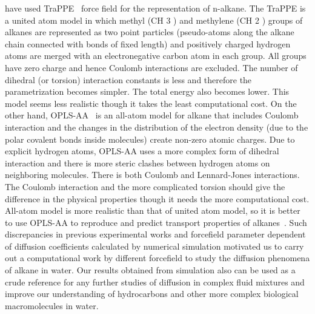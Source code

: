 \begin{sloppypar}
have used TraPPE~\citep{martin1998transferable} force field for the representation of n-alkane. The TraPPE is a united atom model in which methyl (CH 3 ) and methylene (CH 2 ) groups of alkanes are represented as two point particles (pseudo-atoms along the alkane chain connected with bonds of fixed length) and positively charged hydrogen atoms are merged with an electronegative carbon atom in each group. All groups have zero charge and hence Coulomb interactions are excluded. The number of dihedral (or torsion) interaction constants is less and therefore the parametrization becomes simpler. The total energy also becomes lower. This model seems less realistic though it takes the least computational cost. On the other hand, OPLS-AA~\citep{kaminski2001evaluation} is an all-atom model for alkane that includes Coulomb interaction and the changes in the distribution of the electron density (due to the polar covalent bonds inside molecules) create non-zero atomic charges. Due to explicit hydrogen atoms, OPLS-AA uses a more complex form of dihedral interaction and there is more steric clashes between hydrogen atoms on neighboring molecules. There is both Coulomb and Lennard-Jones interactions. The Coulomb interaction and the more complicated torsion should give the difference in the physical properties though it needs the more computational cost. All-atom model is more realistic than that of united atom model, so it is better to use OPLS-AA to reproduce and predict transport properties of alkanes~\citep{moultos2016atomistic, kondratyuk2015relaxation}. Such discrepancies in previous experimental works and forcefield parameter dependent of diffusion coefficients calculated by numerical simulation motivated us to carry out a computational work by different forcefield to study the diffusion phenomena of alkane in water. Our results obtained from simulation also can be used as a crude reference for any further studies of diffusion in complex fluid mixtures and improve our understanding of hydrocarbons and other more complex biological macromolecules in water.
\end{sloppypar}


